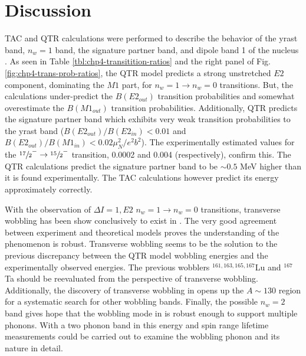 \section{Discussion}
\label{sec:trw-discussion}
TAC and QTR calculations were performed to describe the behavior of the yrast band, $n_w=1$ band, the signature partner band, and dipole band 1 of the nucleus \pr{}. As seen in Table \ref{tbl:chp4-transitition-ratios} and the right panel of Fig. \ref{fig:chp4-trans-prob-ratios}, the QTR model predicts a strong unstretched $E2$ component, dominating the $M1$ part, for $n_w=1\rightarrow{}n_w=0$ transitions. But, the calculations under-predict the $B(E2_{out})$ transition probabilities and somewhat overestimate the $B(M1_{out})$ transition probabilities. Additionally, QTR predicts the signature partner band which exhibits very weak transition probabilities to the yrast band ($B(E2_{out})/B(E2_{in})<0.01$ and $B(E2_{out})/B(M1_{in})<0.02\mu^2_N/e^2b^2$). The experimentally estimated values for the $\sfrac{17}{2}^-\rightarrow\sfrac{15}{2}^-$ transition, 0.0002 and 0.004 (respectively), confirm this. The QTR calculations predict the signature partner band to be $\sim{}0.5$ MeV higher than it is found experimentally. The TAC calculations however predict its energy approximately correctly.

With the observation of $\Delta{}I=1, E2$ $n_w=1\rightarrow{}n_w=0$ transitions, transverse wobbling has been show conclusively to exist in \pr{}. The very good agreement between experiment and theoretical models proves the understanding of the phenomenon is robust. Transverse wobbling seems to be the solution to the previous discrepancy between the QTR model wobbling energies \cite{oldQTRWobblingTheory1,oldQTRWobblingTheory2,oldQTRWobblingTheory3,oldQTRWobblingTheory4} and the experimentally observed energies. The previous wobblers $^{161,163,165,167}$Lu \cite{wobblingIn163Lu,wobblingIn163LuTwoPhonon,wobblingIn165Lu,wobblingIn167Lu,wobblingIn161Lu} and $^{167}$Ta \cite{wobblingIn167Ta} should be reevaluated from the perspective of transverse wobbling. Additionally, the discovery of transverse wobbling in \pr{} opens up the $A\sim{}130$ region for a systematic search for other wobbling bands. Finally, the possible $n_w=2$ band gives hope that the wobbling mode in \pr{} is robust enough to support multiple phonons. With a two phonon band in this energy and spin range lifetime measurements could be carried out to examine the wobbling phonon and its nature in detail.